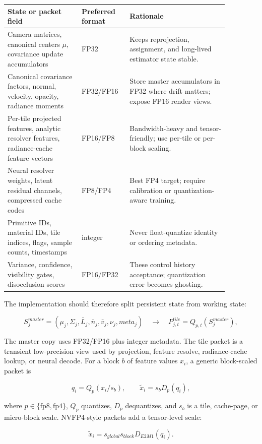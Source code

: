 \documentclass[11pt]{article}
\begin{document}
\begin{center}
\small
\begin{tabular}{p{0.30\linewidth}p{0.17\linewidth}p{0.40\linewidth}}
\toprule
State or packet field & Preferred format & Rationale \\
\midrule
Camera matrices, canonical centers $\mu$, covariance update accumulators & FP32 & Keeps reprojection, assignment, and long-lived estimator state stable. \\
Canonical covariance factors, normal, velocity, opacity, radiance moments & FP32/FP16 & Store master accumulators in FP32 where drift matters; expose FP16 render views. \\
Per-tile projected features, analytic resolver features, radiance-cache feature vectors & FP16/FP8 & Bandwidth-heavy and tensor-friendly; use per-tile or per-block scaling. \\
Neural resolver weights, latent residual channels, compressed cache codes & FP8/FP4 & Best FP4 target; require calibration or quantization-aware training. \\
Primitive IDs, material IDs, tile indices, flags, sample counts, timestamps & integer & Never float-quantize identity or ordering metadata. \\
Variance, confidence, visibility gates, disocclusion scores & FP16/FP32 & These control history acceptance; quantization error becomes ghosting. \\
\bottomrule
\end{tabular}
\end{center}

The implementation should therefore split persistent state from working state:

\[
  S^{master}_j = (\mu_j,\Sigma_j,\bar L_j,\bar n_j,\bar v_j,\nu_j,meta_j)
  \quad\rightarrow\quad
  P^{tile}_{j,t} = Q_{p,t}(S^{master}_j),
\]

The master copy uses FP32/FP16 plus integer metadata. The tile packet is a
transient low-precision view used by projection, feature resolve,
radiance-cache lookup, or neural decode. For a block $b$ of feature values $x_i$, a generic
block-scaled packet is

\[
  q_i = Q_p(x_i/s_b),
  \qquad
  \tilde{x}_i = s_b D_p(q_i),
\]

where $p\in\{\mathrm{fp8},\mathrm{fp4}\}$, $Q_p$ quantizes, $D_p$ dequantizes,
and $s_b$ is a tile, cache-page, or micro-block scale. NVFP4-style packets add
a tensor-level scale:

\[
  \tilde{x}_i = s_{global}s_{block}D_{E2M1}(q_i).
\]
\end{document}

